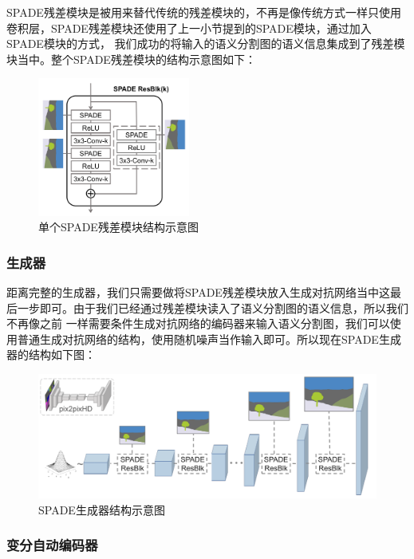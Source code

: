 \documentclass[supercite]{HustGraduPaper}
\theoremstyle{definition}
\begin{document}
SPADE残差模块是被用来替代传统的残差模块的，不再是像传统方式一样只使用卷积层，SPADE残差模块还使用了上一小节提到的SPADE模块，通过加入SPADE模块的方式，
我们成功的将输入的语义分割图的语义信息集成到了残差模块当中。整个SPADE残差模块的结构示意图如下：
\begin{figure}[H]
  \begin{center}
  \includegraphics[width=5cm]{images/SPADE-ResBlock}
  \end{center}
  \caption{单个SPADE残差模块结构示意图}
  \label{fig:SPADE-ResBlock}
\end{figure}

\subsubsection{生成器}

距离完整的生成器，我们只需要做将SPADE残差模块放入生成对抗网络当中这最后一步即可。由于我们已经通过残差模块读入了语义分割图的语义信息，所以我们不再像之前
一样需要条件生成对抗网络的编码器来输入语义分割图，我们可以使用普通生成对抗网络的结构，使用随机噪声当作输入即可。所以现在SPADE生成器的结构如下图：
\begin{figure}[H]
  \begin{center}
  \includegraphics[width=12cm]{images/SPADE-generator}
  \end{center}
  \caption{SPADE生成器结构示意图}
  \label{fig:SPADE-generator}
\end{figure}

\subsubsection{变分自动编码器}
\end{document}
